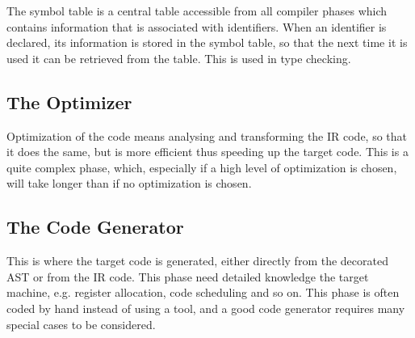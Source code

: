 The symbol table is a central table accessible from all compiler phases which contains information that is associated with identifiers. When an identifier is declared, its information is stored in the symbol table, so that the next time it is used it can be retrieved from the table. This is used in type checking.

\subsection{The Optimizer}

Optimization of the code means analysing and transforming the IR code, so that it does the same, but is more efficient thus speeding up the target code. This is a quite complex phase, which, especially if a high level of optimization is chosen, will take longer than if no optimization is chosen.

\subsection{The Code Generator}
This is where the target code is generated, either directly from the decorated AST or from the IR code. This phase need detailed knowledge the target machine, e.g. register allocation, code scheduling and so on. This phase is often coded by hand instead of using a tool, and a good code generator requires many special cases to be considered.